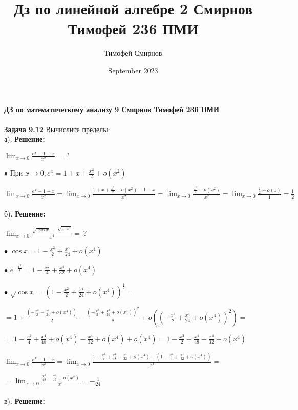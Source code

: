 \documentclass[a4paper, 12pt]{article}
\title{Дз по линейной алгебре 2 Смирнов Тимофей 236 ПМИ}
\author{Тимофей Смирнов}
\date{September 2023}
\begin{document}
    {\center \bf \large ДЗ по математическому анализу 9 Смирнов Тимофей 236 ПМИ}
    \\
    \\ \textbf{Задача 9.12} Вычислите пределы:
    \\ а). \textbf{Решение: }
    \par $\lim_{x \to 0} \frac{e^x - 1 - x}{x^2} = \ ?$
    \\
    \par $\bullet$ При $x \to 0, e^x = 1 + x + \frac{x^2}{2} + o(x^2)$
    \\
    \par $\lim_{x \to 0} \frac{e^x - 1 - x}{x^2} = \lim_{x \to 0} \frac{1 + x + \frac{x^2}{2} + o(x^2) - 1 - x}{x^2} = \lim_{x \to 0} \frac{\frac{x^2}{2} + o(x^2)}{x^2} = \lim_{x \to 0} \frac{\frac{1}{2} + o(1)}{1} = \frac{1}{2}$
    \\
    \\ б).  \textbf{Решение: }
    \par $\lim_{x \to 0} \frac{\sqrt{\cos{x}} - \sqrt[4]{e^{-x^2}}}{x^4} = \ ?$
    \\
    \par $\bullet$ $\cos{x} = 1 - \frac{x^2}{2} + \frac{x^4}{24} + o(x^4)$
    \\
    \par $\bullet$ $e^{-\frac{x^2}{4}} = 1 - \frac{x^2}{4} + \frac{x^4}{32} + o(x^4)$
    \\
    \par $\bullet$ $\sqrt{\cos{x}} = \left(1 - \frac{x^2}{2} + \frac{x^4}{24} + o(x^4)\right)^{\frac{1}{2}} = $\par$ = 1 + \frac{\left(- \frac{x^2}{2} + \frac{x^4}{24} + o(x^4)\right)}{2} - \frac{\left(- \frac{x^2}{2} + \frac{x^4}{24} + o(x^4)\right)^2}{8} + o\left(\left(- \frac{x^2}{2} + \frac{x^4}{24} + o(x^4)\right)^2\right) = $ \par $ = 1 - \frac{x^2}{4} + \frac{x^4}{48} + o(x^4) - \frac{x^4}{32} + o(x^4) + o(x^4) = 1 - \frac{x^2}{2} + \frac{x^4}{48} - \frac{x^4}{32} + o(x^4)$
    \\
    \par $\lim_{x \to 0} \frac{e^x - 1 - x}{x^2} = \lim_{x \to 0} \frac{1 - \frac{x^2}{4} + \frac{x^4}{48} - \frac{x^4}{32} + o(x^4) - \left(1 - \frac{x^2}{4} + \frac{x^4}{32} + o(x^4)\right)}{x^4} = $\par$= \lim_{x \to 0} \frac{\frac{x^4}{48} - \frac{x^4}{16} + o(x^4)}{x^4} = -\frac{1}{24}$
    \\
    \\ в).   \textbf{Решение: }
\end{document}
